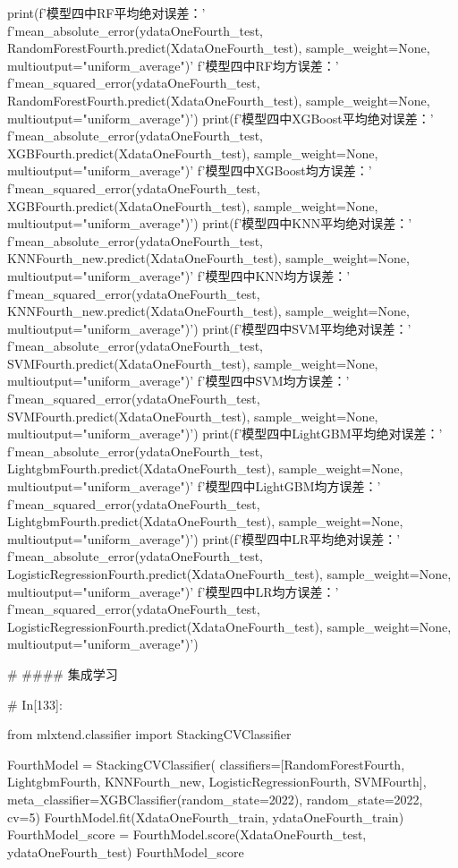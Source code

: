 \documentclass{MathorCupmodeling}
\begin{document}
\begin{python}
	
	print(f'模型四中RF平均绝对误差：'
		  f'{mean_absolute_error(ydataOneFourth_test, RandomForestFourth.predict(XdataOneFourth_test), sample_weight=None, multioutput="uniform_average")}\n'
		  f'模型四中RF均方误差：'
		  f'{mean_squared_error(ydataOneFourth_test, RandomForestFourth.predict(XdataOneFourth_test), sample_weight=None, multioutput="uniform_average")}')
	print(f'模型四中XGBoost平均绝对误差：'
		  f'{mean_absolute_error(ydataOneFourth_test, XGBFourth.predict(XdataOneFourth_test), sample_weight=None, multioutput="uniform_average")}\n'
		  f'模型四中XGBoost均方误差：'
		  f'{mean_squared_error(ydataOneFourth_test, XGBFourth.predict(XdataOneFourth_test), sample_weight=None, multioutput="uniform_average")}')
	print(f'模型四中KNN平均绝对误差：'
		  f'{mean_absolute_error(ydataOneFourth_test, KNNFourth_new.predict(XdataOneFourth_test), sample_weight=None, multioutput="uniform_average")}\n'
		  f'模型四中KNN均方误差：'
		  f'{mean_squared_error(ydataOneFourth_test, KNNFourth_new.predict(XdataOneFourth_test), sample_weight=None, multioutput="uniform_average")}')
	print(f'模型四中SVM平均绝对误差：'
		  f'{mean_absolute_error(ydataOneFourth_test, SVMFourth.predict(XdataOneFourth_test), sample_weight=None, multioutput="uniform_average")}\n'
		  f'模型四中SVM均方误差：'
		  f'{mean_squared_error(ydataOneFourth_test, SVMFourth.predict(XdataOneFourth_test), sample_weight=None, multioutput="uniform_average")}')
	print(f'模型四中LightGBM平均绝对误差：'
		  f'{mean_absolute_error(ydataOneFourth_test, LightgbmFourth.predict(XdataOneFourth_test), sample_weight=None, multioutput="uniform_average")}\n'
		  f'模型四中LightGBM均方误差：'
		  f'{mean_squared_error(ydataOneFourth_test, LightgbmFourth.predict(XdataOneFourth_test), sample_weight=None, multioutput="uniform_average")}')
	print(f'模型四中LR平均绝对误差：'
		  f'{mean_absolute_error(ydataOneFourth_test, LogisticRegressionFourth.predict(XdataOneFourth_test), sample_weight=None, multioutput="uniform_average")}\n'
		  f'模型四中LR均方误差：'
		  f'{mean_squared_error(ydataOneFourth_test, LogisticRegressionFourth.predict(XdataOneFourth_test), sample_weight=None, multioutput="uniform_average")}')
	
	# #### 集成学习
	
	# In[133]:
	
	
	from mlxtend.classifier import StackingCVClassifier
	
	FourthModel = StackingCVClassifier(
		classifiers=[RandomForestFourth, LightgbmFourth, KNNFourth_new, LogisticRegressionFourth, SVMFourth],
		meta_classifier=XGBClassifier(random_state=2022), random_state=2022, cv=5)
	FourthModel.fit(XdataOneFourth_train, ydataOneFourth_train)
	FourthModel_score = FourthModel.score(XdataOneFourth_test, ydataOneFourth_test)
	FourthModel_score
	

\end{python}
\end{document}

